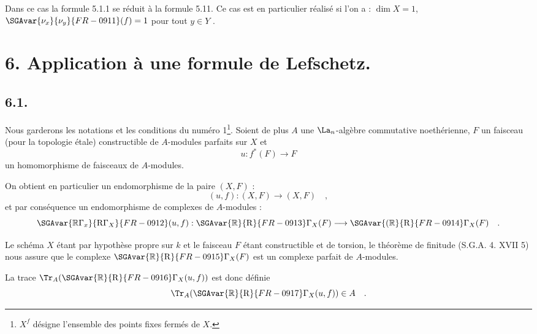 
Dans ce cas la formule 5.1.1 se réduit à la formule 5.11. Ce cas est en particulier réalisé si l'on a : $\dim X = 1$, $\SGAvar{\nu_x}{\nu_y}{FR-0911}(f)=1$ pour tout $y\in Y$ .
\section*{6. Application à une formule de Lefschetz.}

\subsection*{6.1.}
Nous garderons les notations et les conditions du numéro 1\footnote{$X^f$ désigne l'ensemble des points fixes fermés de $X$.}. Soient de plus $A$ une $\La_n$-algèbre commutative noethérienne, $F$ un faisceau (pour la topologie étale) constructible de $A$-modules parfaits sur $X$ et
\[
u : f^*(F) \longrightarrow F
\]
un homomorphisme de faisceaux de $A$-modules.

On obtient en particulier un endomorphisme de la paire $(X, F)$ :
\[
(u, f) : (X, F) \longrightarrow (X, F) \quad ,
\]
et par conséquence un endomorphisme de complexes de $A$-modules :
\[
\SGAvar{\mathbb{R}\Gamma_x}{\mathrm{R}\Gamma_X}{FR-0912}(u, f) : \SGAvar{\mathbb{R}}{\mathrm{R}}{FR-0913}\Gamma_X(F) \longrightarrow \SGAvar{(\mathbb{R}}{\mathrm{R}}{FR-0914}\Gamma_X(F) \quad .
\]

Le schéma $X$ étant par hypothèse propre sur $k$ et le faisceau $F$ étant constructible et de torsion, le théorème de finitude (S.G.A. 4. XVII 5) nous assure que le complexe $\SGAvar{\mathbb{R}}{\mathrm{R}}{FR-0915}\Gamma_X(F)$ est un complexe parfait de $A$-modules.

La trace $\Tr_A(\SGAvar{\mathbb{R}}{\mathrm{R}}{FR-0916}\Gamma_X(u, f))$ est donc définie
\[
\Tr_A(\SGAvar{\mathbb{R}}{\mathrm{R}}{FR-0917}\Gamma_X(u, f)) \in A \quad .
\]

